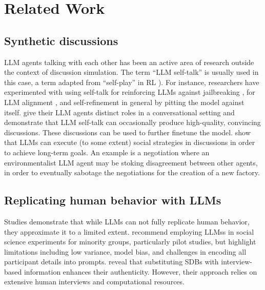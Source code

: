 %

\section{Related Work}


\subsection{Synthetic discussions}

\ac{LLM} agents talking with each other has been an active area of research outside the context of discussion simulation. The term “\ac{LLM} self-talk” is usually used in this case, a term adapted from “self-play” in \ac{RL} \citep{cheng-self-play}). For instance, researchers have experimented with using self-talk for reinforcing \acp{LLM} against jailbreaking \cite{liu2024largelanguagemodelsagents, cheng-self-play, zheng2024optimalllmalignmentsusing}, for \ac{LLM} alignment \cite{Bai2022ConstitutionalAH, collective_constitution}, and self-refinement in general \cite{Madaan2023SelfRefineIR, lambert2024} by pitting the model against itself. \citet{ulmer2024} give their \ac{LLM} agents distinct roles in a conversational setting and demonstrate that \ac{LLM} self-talk can occasionally produce high-quality, convincing discussions. These discussions can be used to further finetune the model.  \citet{abdelnabi_negotiations} show that \acp{LLM} can execute (to some extent) social strategies in discussions in order to achieve long-term goals. An example is a negotiation where an environmentalist \ac{LLM} agent may be stoking disagreement between other agents, in order to eventually sabotage the negotiations for the creation of a new factory.


\subsection{Replicating human behavior with LLMs}

Studies demonstrate that while \acp{LLM} can not fully replicate human behavior, they approximate it to a limited extent. \citet{hewitt2024predicting} recommend employing \acp{LLM}s in social science experiments for minority groups, particularly pilot studies, but highlight limitations including low variance, model bias, and challenges in encoding all participant details into prompts. \citet{park2024generativeagentsimulations1000} reveal that substituting \acp{SDB} with interview-based information enhances their authenticity. However, their approach relies on extensive human interviews and computational resources.

